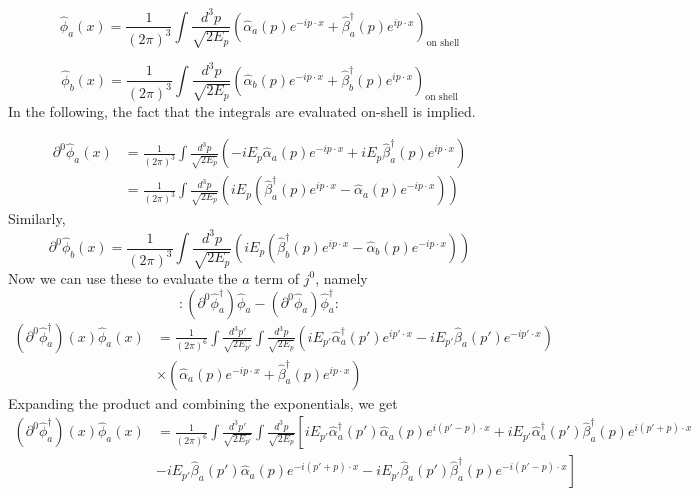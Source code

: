 \begin{equation}
\hat{\phi}_a (x) = \frac{1}{(2\pi)^3} \int \frac{d^3 p}{\sqrt{2E_p}} \left( \hat{\alpha}_a (p) e^{-ip\cdot x} + \hat{\beta}_a^\dagger (p) e^{ip\cdot x} \right)_{\text{on shell}}
\label{eq:phia}
\end{equation}

\begin{equation}
\hat{\phi}_b (x) = \frac{1}{(2\pi)^3} \int \frac{d^3 p}{\sqrt{2E_p}} \left( \hat{\alpha}_b (p) e^{-ip\cdot x} + \hat{\beta}_b^\dagger (p) e^{ip\cdot x} \right)_{\text{on shell}}
\label{eq:phib}
\end{equation}
In the following, the fact that the integrals are evaluated on-shell is implied.

\begin{align}
\partial^0 \hat{\phi}_a (x) &=  \frac{1}{(2\pi)^3} \int \frac{d^3 p}{\sqrt{2E_p}} \left( -iE_p \hat{\alpha}_a (p) e^{-ip\cdot x} + iE_p \hat{\beta}_a^\dagger (p) e^{ip\cdot x} \right) \\
&= \frac{1}{(2\pi)^3} \int \frac{d^3 p}{\sqrt{2E_p}} \left( iE_p \left(\hat{\beta}_a^\dagger (p) e^{ip\cdot x} - \hat{\alpha}_a (p) e^{-ip\cdot x}\right) \right)
\label{eq:timederivative_of_phia}
\end{align}
Similarly, 
\begin{equation}
\partial^0 \hat{\phi}_b (x) = \frac{1}{(2\pi)^3} \int \frac{d^3 p}{\sqrt{2E_p}} \left( iE_p \left(\hat{\beta}_b^\dagger (p) e^{ip\cdot x} - \hat{\alpha}_b (p) e^{-ip\cdot x}\right) \right)
\label{eq:timederivative_of_phib}
\end{equation}
Now we can use these to evaluate the $a$ term of $j^0$, namely
\begin{equation}:(\partial^0 \hat{\phi}_a^\dagger)\hat{\phi}_a-(\partial^0 \hat{\phi}_a)\hat{\phi}_a^\dagger:\label{eq:a_term}\end{equation}
\begin{align*}
(\partial^0 \hat{\phi}_a^\dagger)(x) \hat{\phi}_a (x) &= \frac{1}{(2\pi)^6} \int \frac{d^3 p'}{\sqrt{2E_{p'}}} \int \frac{d^3 p}{\sqrt{2E_p}} \left( iE_{p'} \hat{\alpha}_a^\dagger (p') e^{ip'\cdot x} - iE_{p'} \hat{\beta}_a (p') e^{-ip'\cdot x} \right)  \\ &\times \left( \hat{\alpha}_a (p) e^{-ip\cdot x} + \hat{\beta}_a^\dagger (p) e^{ip\cdot x} \right)
\end{align*}
Expanding the product and combining the exponentials, we get
\begin{align*}
(\partial^0 \hat{\phi}_a^\dagger)(x) \hat{\phi}_a (x) &= \frac{1}{(2\pi)^6} \int \frac{d^3 p'}{\sqrt{2E_{p'}}} \int \frac{d^3 p}{\sqrt{2E_p}} \left[ iE_{p'} \hat{\alpha}_a^\dagger (p') \hat{\alpha}_a (p) e^{i(p' - p) \cdot x} +  iE_{p'} \hat{\alpha}_a^\dagger (p') \hat{\beta}_a^\dagger (p) e^{i(p' + p) \cdot x} \right .\\
& - \left .iE_{p'} \hat{\beta}_a (p') \hat{\alpha}_a (p) e^{-i(p' + p) \cdot x} - iE_{p'} \hat{\beta}_a (p') \hat{\beta}_a^\dagger (p) e^{-i(p' - p) \cdot x} \right]
\end{align*}
